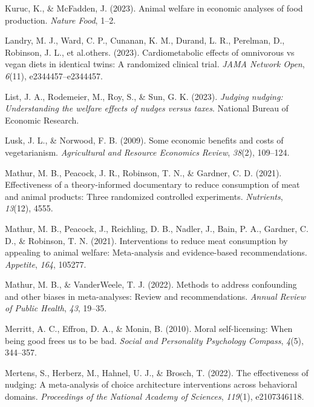 \documentclass[
  man]{apa6}
\newlength{\cslhangindent}
\newenvironment{CSLReferences}[2] %
 {\begin{list}{}{%
  \setlength{\itemindent}{0pt}
  \setlength{\leftmargin}{0pt}
  \setlength{\parsep}{0pt}
  \ifodd #1
   \setlength{\leftmargin}{\cslhangindent}
   \setlength{\itemindent}{-1\cslhangindent}
  \fi
  \setlength{\itemsep}{#2\baselineskip}}}
 {\end{list}}
\begin{document}
\begin{CSLReferences}{1}{0}
Kuruc, K., \& McFadden, J. (2023). Animal welfare in economic analyses of food production. \emph{Nature Food}, 1--2.

Landry, M. J., Ward, C. P., Cunanan, K. M., Durand, L. R., Perelman, D., Robinson, J. L., et al.others. (2023). Cardiometabolic effects of omnivorous vs vegan diets in identical twins: A randomized clinical trial. \emph{JAMA Network Open}, \emph{6}(11), e2344457--e2344457.

List, J. A., Rodemeier, M., Roy, S., \& Sun, G. K. (2023). \emph{Judging nudging: Understanding the welfare effects of nudges versus taxes}. National Bureau of Economic Research.

Lusk, J. L., \& Norwood, F. B. (2009). Some economic benefits and costs of vegetarianism. \emph{Agricultural and Resource Economics Review}, \emph{38}(2), 109--124.

Mathur, M. B., Peacock, J. R., Robinson, T. N., \& Gardner, C. D. (2021). Effectiveness of a theory-informed documentary to reduce consumption of meat and animal products: Three randomized controlled experiments. \emph{Nutrients}, \emph{13}(12), 4555.

Mathur, M. B., Peacock, J., Reichling, D. B., Nadler, J., Bain, P. A., Gardner, C. D., \& Robinson, T. N. (2021). Interventions to reduce meat consumption by appealing to animal welfare: Meta-analysis and evidence-based recommendations. \emph{Appetite}, \emph{164}, 105277.

Mathur, M. B., \& VanderWeele, T. J. (2022). Methods to address confounding and other biases in meta-analyses: Review and recommendations. \emph{Annual Review of Public Health}, \emph{43}, 19--35.

Merritt, A. C., Effron, D. A., \& Monin, B. (2010). Moral self-licensing: When being good frees us to be bad. \emph{Social and Personality Psychology Compass}, \emph{4}(5), 344--357.

Mertens, S., Herberz, M., Hahnel, U. J., \& Brosch, T. (2022). The effectiveness of nudging: A meta-analysis of choice architecture interventions across behavioral domains. \emph{Proceedings of the National Academy of Sciences}, \emph{119}(1), e2107346118.


\end{CSLReferences}
\end{document}
